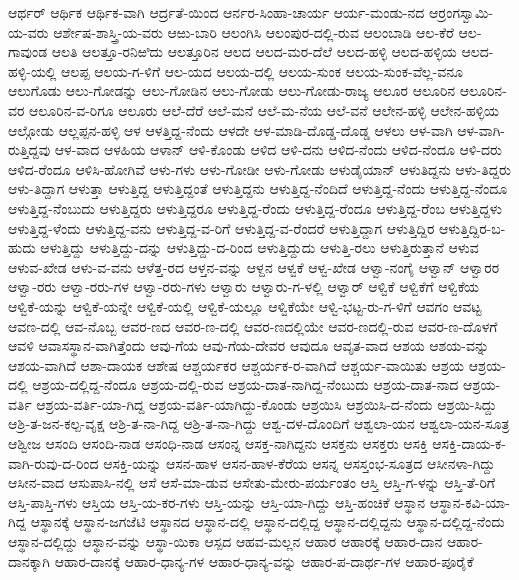 ಆರ್ಥರ್
ಆರ್ಥಿಕ
ಆರ್ಥಿಕ-ವಾಗಿ
ಆರ್ದ್ರತೆ-ಯಿಂದ
ಆರ್ನರ-ಸಿಂಹಾ-ಚಾರ್ಯ
ಆರ್ಯ-ಮಂಡು-ನದ
ಆರ್ರಂಗಸ್ವಾಮಿ-ಯ-ವರು
ಆರ್ಶೇಷ-ಶಾಸ್ತ್ರಿ-ಯ-ವರು
ಆಱು-ಬಾರಿ
ಆಲಂಗಿಸಿ
ಆಲಂಪುರ-ದಲ್ಲಿ-ರುವ
ಆಲಂಬಾಡಿ
ಆಲ-ಕೆರೆ
ಆಲ-ಗಾವುಂಡ
ಆಲತಿ
ಆಲತ್ತೂ-ರನಿಱಿದು
ಆಲತ್ತೂರಿನ
ಆಲದ
ಆಲದ-ಮರ-ದೆಲೆ
ಆಲದ-ಹಳ್ಳಿ
ಆಲದ-ಹಳ್ಳಿಯ
ಆಲದ-ಹಳ್ಳಿ-ಯಲ್ಲಿ
ಆಲಪ್ಪ
ಆಲಯ-ಗ-ಳಿಗೆ
ಆಲ-ಯದ
ಆಲಯ-ದಲ್ಲಿ
ಆಲಯ-ಸುಂಕ
ಆಲಯ-ಸುಂಕ-ವೆಲ್ಲ-ವನೂ
ಆಲುಗೊಡು
ಆಲು-ಗೋಡನ್ನು
ಆಲು-ಗೋಡಿನ
ಆಲು-ಗೋಡು
ಆಲು-ಗೋಡು-ರಾಜ್ಯ
ಆಲೂರ
ಆಲೂರಿನ
ಆಲೂರಿನ-ವರ
ಆಲೂರಿನ-ವ-ರಿಗೂ
ಆಲೂರು
ಆಲೆ-ದೆರೆ
ಆಲೆ-ಮನೆ
ಆಲೆ-ಮ-ನೆಯ
ಆಲೆ-ವನೆ
ಆಲೇನ-ಹಳ್ಳಿ
ಆಲೇನ-ಹಳ್ಳಿಯ
ಆಲ್ಗೋಡು
ಆಲ್ಲಪ್ಪನ-ಹಳ್ಳಿ
ಆಳ
ಆಳತ್ತಿದ್ದ-ನೆಂದು
ಆಳದೇ
ಆಳ-ಮಾಡಿ-ದೊಡ್ಡ-ದೊಡ್ಡ
ಆಳಲು
ಆಳ-ವಾಗಿ
ಆಳ-ವಾಗಿ-ರುತ್ತಿದ್ದವು
ಆಳ-ವಾದ
ಆಳಹಿಯ
ಆಳಾನ್
ಆಳಿ-ಕೊಂಡು
ಆಳಿದ
ಆಳಿ-ದನು
ಆಳಿದ-ನೆಂದು
ಆಳಿದ-ನೆಂದೂ
ಆಳಿ-ದರು
ಆಳಿದ-ರೆಂದೂ
ಆಳಿಸಿ-ಹೋಗಿವೆ
ಆಳು-ಗಳು
ಆಳು-ಗೋಡೀ
ಆಳು-ಗೋಡು
ಆಳುಡೈಯಾನ್
ಆಳುತಿದ್ದನು
ಆಳು-ತಿದ್ದರು
ಆಳು-ತಿದ್ದಾಗ
ಆಳುತ್ತಾ
ಆಳುತ್ತಿದ್ದ
ಆಳುತ್ತಿದ್ದಂತೆ
ಆಳುತ್ತಿದ್ದನು
ಆಳುತ್ತಿದ್ದ-ನೆಂದಿದೆ
ಆಳುತ್ತಿದ್ದ-ನೆಂದು
ಆಳುತ್ತಿದ್ದ-ನೆಂದೂ
ಆಳುತ್ತಿದ್ದ-ನೆಂಬುದು
ಆಳುತ್ತಿದ್ದರು
ಆಳುತ್ತಿದ್ದರೂ
ಆಳುತ್ತಿದ್ದ-ರೆಂದು
ಆಳುತ್ತಿದ್ದ-ರೆಂದೂ
ಆಳುತ್ತಿದ್ದ-ರೆಂಬ
ಆಳುತ್ತಿದ್ದಳು
ಆಳುತ್ತಿದ್ದ-ಳೆಂದು
ಆಳುತ್ತಿದ್ದ-ವನು
ಆಳುತ್ತಿದ್ದ-ವ-ರಿಗೆ
ಆಳುತ್ತಿದ್ದ-ವ-ರೆಂದರೆ
ಆಳುತ್ತಿದ್ದಾಗ
ಆಳುತ್ತಿದ್ದಿರ
ಆಳುತ್ತಿದ್ದಿರ-ಬ-ಹುದು
ಆಳುತ್ತಿದ್ದು
ಆಳುತ್ತಿದ್ದು-ದನ್ನು
ಆಳುತ್ತಿದ್ದು-ದ-ರಿಂದ
ಆಳುತ್ತಿದ್ದುದು
ಆಳುತ್ತಿ-ರಲು
ಆಳುತ್ತಿರುತ್ತಾನೆ
ಆಳುವ
ಆಳುವ-ಖೇಡ
ಆಳು-ವ-ವನು
ಆಳೆತ್ತ-ರದ
ಆಳ್ತನ-ವನ್ನು
ಆಳ್ದನ
ಆಳ್ವಕೆ
ಆಳ್ವ-ಖೇಡ
ಆಳ್ವಾ-ನಂಗೈ
ಆಳ್ವಾನ್
ಆಳ್ವಾರರ
ಆಳ್ವಾ-ರರು
ಆಳ್ವಾ-ರರು-ಗಳ
ಆಳ್ವಾ-ರರು-ಗಳು
ಆಳ್ವಾರು
ಆಳ್ವಾರು-ಗ-ಳಲ್ಲಿ
ಆಳ್ವಾರ್
ಆಳ್ವಿಕೆ
ಆಳ್ವಿಕೆಗೆ
ಆಳ್ವಿಕೆಯ
ಆಳ್ವಿಕೆ-ಯನ್ನು
ಆಳ್ವಿಕೆ-ಯನ್ನೇ
ಆಳ್ವಿಕೆ-ಯಲ್ಲಿ
ಆಳ್ವಿಕೆ-ಯಲ್ಲೂ
ಆಳ್ವಿಕೆಯೇ
ಆಳ್ವಿ-ಭಟ್ಟ-ರು-ಗ-ಳಿಗೆ
ಆವಗಂ
ಆವಟ್ಟ
ಆವಣ-ದಲ್ಲಿ
ಆವ-ನೊಬ್ಬ
ಆವರ-ಣದ
ಆವರ-ಣ-ದಲ್ಲಿ
ಆವರ-ಣದಲ್ಲಿಯೇ
ಆವರ-ಣದಲ್ಲಿ-ರುವ
ಆವರ-ಣ-ದೊಳಗೆ
ಆವಳಿ
ಆವಾಸಸ್ಥಾನ-ವಾಗಿತ್ತೆಂದು
ಆವು-ಗೆಯ
ಆವು-ಗೆಯ-ದೇವರ
ಆವುದೂ
ಆವೃತ-ವಾದ
ಆಶಯ
ಆಶಯ-ವನ್ನು
ಆಶಯ-ವಾಗಿದೆ
ಆಶಾ-ದಾಯಕ
ಆಶೇಷ
ಆಶ್ಚರ್ಯಕರ
ಆಶ್ಚರ್ಯಕ-ರ-ವಾಗಿದೆ
ಆಶ್ಚರ್ಯ-ವಾಯಿತು
ಆಶ್ರಯ
ಆಶ್ರಯ-ದಲ್ಲಿ
ಆಶ್ರಯ-ದಲ್ಲಿದ್ದ-ನೆಂದೂ
ಆಶ್ರಯ-ದಲ್ಲಿ-ರುವ
ಆಶ್ರಯ-ದಾತ-ನಾಗಿದ್ದ-ನೆಂಬುದು
ಆಶ್ರಯ-ದಾತ-ನಾದ
ಆಶ್ರಯ-ವರ್ತಿ
ಆಶ್ರಯ-ವರ್ತಿ-ಯಾ-ಗಿದ್ದ
ಆಶ್ರಯ-ವರ್ತಿ-ಯಾಗಿದ್ದು-ಕೊಂಡು
ಆಶ್ರಯಿಸಿ
ಆಶ್ರಯಿಸಿ-ದ-ನೆಂದು
ಆಶ್ರಯಿ-ಸಿದ್ದು
ಆಶ್ರಿ-ತ-ಜನ-ಕಲ್ಪ-ವೃಕ್ಷ
ಆಶ್ರಿ-ತ-ನಾ-ಗಿದ್ದ
ಆಶ್ರಿ-ತ-ನಾ-ಗಿದ್ದು
ಆಶ್ವ-ದಳ-ದೊಂದಿಗೆ
ಆಶ್ವಲಾ-ಯನ
ಆಶ್ವಲಾ-ಯನ-ಸೂತ್ರ
ಆಶ್ವೀಜ
ಆಸಂದಿ
ಆಸಂದಿ-ನಾಡ
ಆಸಂಧಿ-ನಾಡ
ಆಸಂನ್ನ
ಆಸಕ್ತ-ನಾಗಿದ್ದನು
ಆಸಕ್ತನು
ಆಸಕ್ತರು
ಆಸಕ್ತಿ
ಆಸಕ್ತಿ-ದಾಯ-ಕ-ವಾಗಿ-ರುವು-ದ-ರಿಂದ
ಆಸಕ್ತಿ-ಯನ್ನು
ಆಸನ-ಹಾಳ
ಆಸನ-ಹಾಳ-ಕೆರೆಯ
ಆಸನ್ನ
ಆಸಸ್ತಂಭ-ಸೂತ್ರದ
ಆಸೀನಳಾ-ಗಿದ್ದು
ಆಸೀನ-ವಾದ
ಆಸುಪಾಸಿ-ನಲ್ಲಿ
ಆಸೆ
ಆಸೆ-ಮಾ-ಡುವ
ಆಸೇತು-ಮೇರು-ಪರ್ಯಂತಂ
ಆಸ್ತಿ
ಆಸ್ತಿ-ಗ-ಳನ್ನು
ಆಸ್ತಿ-ತೆ-ರಿಗೆ
ಆಸ್ತಿ-ಪಾಸ್ತಿ-ಗಳು
ಆಸ್ತಿಯ
ಆಸ್ತಿ-ಯ-ಕರ-ಗಳು
ಆಸ್ತಿ-ಯನ್ನು
ಆಸ್ತಿ-ಯಾ-ಗಿದ್ದು
ಆಸ್ತಿ-ಹಂಚಿಕೆ
ಆಸ್ಥಾನ
ಆಸ್ಥಾನ-ಕವಿ-ಯಾ-ಗಿದ್ದ
ಆಸ್ಥಾನಕ್ಕೆ
ಆಸ್ಥಾನ-ಜಗಜೆಟಿ
ಆಸ್ಥಾನದ
ಆಸ್ಥಾನ-ದಲ್ಲಿ
ಆಸ್ಥಾನ-ದಲ್ಲಿದ್ದ
ಆಸ್ಥಾನ-ದಲ್ಲಿದ್ದನು
ಆಸ್ಥಾನ-ದಲ್ಲಿದ್ದ-ನೆಂದು
ಆಸ್ಥಾನ-ದಲ್ಲಿದ್ದು
ಆಸ್ಥಾನ-ವನ್ನು
ಆಸ್ಥಾ-ಯಿಕಾ
ಆಸ್ಪದ
ಆಹವ-ಮಲ್ಲನ
ಆಹಾರ
ಆಹಾರಕ್ಕೆ
ಆಹಾರ-ದಾನ
ಆಹಾರ-ದಾನಕ್ಕಾಗಿ
ಆಹಾರ-ದಾನಕ್ಕೆ
ಆಹಾರ-ಧಾನ್ಯ-ಗಳ
ಆಹಾರ-ಧಾನ್ಯ-ವನ್ನು
ಆಹಾರ-ಪ-ದಾರ್ಥ-ಗಳ
ಆಹಾರ-ಪೂರೈಕೆ
